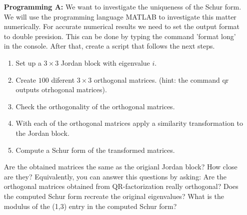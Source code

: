 \documentclass[14pt]{report}
\begin{document}
\begin{enumerate}
  \item[\textbf{Programming A:}] We want to investigate the uniqueness
    of the Schur form. We will use the programming language MATLAB to 
    investigate this matter numerically. For accurate numerical results we 
    need to set the output format to double presision. This can be done by
    typing the command 'format long' in the console. After that, create a
    script that follows the next steps.
    \begin{enumerate}
      \item Set up a $3\times3$ Jordan block with eigenvalue $i$.
      \item Create $100$ diferent $3\times3$ orthogonal matrices. (hint: the
        command qr outputs otrhogonal matrices).
      \item Check the orthogonality of the orthogonal matrices.
      \item With each of the orthogonal matrices apply a similarity
        transformation to the Jordan block.
      \item Compute a Schur form of the transformed matrices.
    \end{enumerate}
    Are the obtained matrices the same as the origianl Jordan block? How
    close are they? Equivalently, you can answer this questions by asking: 
    Are the orthogonal matrices obtained from QR-factorization really
    orthogonal? Does the computed Schur form recreate the original eigenvalues?
    What is the modulus of the (1,3) entry in the computed Schur form?

  \end{enumerate}
\end{document}
